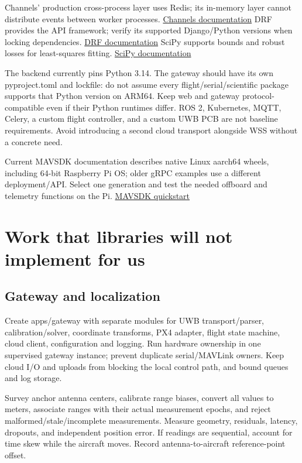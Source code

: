 \documentclass[10pt,letterpaper]{article}
\begin{document}
Channels' production cross-process layer uses Redis; its in-memory layer cannot distribute events between worker processes. \href{https://channels.readthedocs.io/en/latest/topics/channel_layers.html}{Channels documentation} DRF provides the API framework; verify its supported Django/Python versions when locking dependencies. \href{https://www.django-rest-framework.org/}{DRF documentation} SciPy supports bounds and robust losses for least-squares fitting. \href{https://docs.scipy.org/doc/scipy/reference/generated/scipy.optimize.least_squares.html}{SciPy documentation}

The backend currently pins Python 3.14. The gateway should have its own pyproject.toml and lockfile: do not assume every flight/serial/scientific package supports that Python version on ARM64. Keep web and gateway protocol-compatible even if their Python runtimes differ. ROS 2, Kubernetes, MQTT, Celery, a custom flight controller, and a custom UWB PCB are not baseline requirements. Avoid introducing a second cloud transport alongside WSS without a concrete need.

Current MAVSDK documentation describes native Linux aarch64 wheels, including 64-bit Raspberry Pi OS; older gRPC examples use a different deployment/API. Select one generation and test the needed offboard and telemetry functions on the Pi. \href{https://mavsdk.mavlink.io/main/en/python/quickstart.html}{MAVSDK quickstart}

\section{Work that libraries will not implement for us}
\subsection{Gateway and localization}
Create apps/gateway with separate modules for UWB transport/parser, calibration/solver, coordinate transforms, PX4 adapter, flight state machine, cloud client, configuration and logging. Run hardware ownership in one supervised gateway instance; prevent duplicate serial/MAVLink owners. Keep cloud I/O and uploads from blocking the local control path, and bound queues and log storage.

Survey anchor antenna centers, calibrate range biases, convert all values to meters, associate ranges with their actual measurement epochs, and reject malformed/stale/incomplete measurements. Measure geometry, residuals, latency, dropouts, and independent position error. If readings are sequential, account for time skew while the aircraft moves. Record antenna-to-aircraft reference-point offset.
\end{document}

